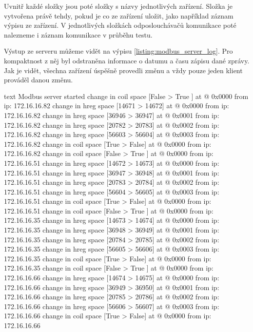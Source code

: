 Uvnitř každé složky jsou poté složky s názvy jednotlivých zařízení. Složka je vytvořena právě tehdy, pokud je co ze zařízení uložit, jako například záznam výpisu ze zařízení. V jednotlivých složkách odposlouchávačů komunikace poté nalezneme i záznam komunikace v průběhu testu. 

Výstup ze serveru můžeme vidět na výpisu \ref{listing:modbus_server_log}. Pro kompaktnost z něj byl odstraněna informace o datumu a času zápisu dané zprávy. Jak je vidět, všechna zařízení úspěšně provedli změnu a vždy pouze jeden klient prováděl danou změnu.

\begin{listing}[htbp]
    \centering
    \begin{cminted}[breaklines,autogobble, fontsize=\footnotesize]{text}
Modbus server started
change in coil space [False > True ] at @ 0x0000 from ip: 172.16.16.82   
change in hreg space [14671 > 14672] at @ 0x0000 from ip: 172.16.16.82   
change in hreg space [36946 > 36947] at @ 0x0001 from ip: 172.16.16.82   
change in hreg space [20782 > 20783] at @ 0x0002 from ip: 172.16.16.82   
change in hreg space [56603 > 56604] at @ 0x0003 from ip: 172.16.16.82   
change in coil space [True  > False] at @ 0x0000 from ip: 172.16.16.82   
change in coil space [False > True ] at @ 0x0000 from ip: 172.16.16.51   
change in hreg space [14672 > 14673] at @ 0x0000 from ip: 172.16.16.51   
change in hreg space [36947 > 36948] at @ 0x0001 from ip: 172.16.16.51   
change in hreg space [20783 > 20784] at @ 0x0002 from ip: 172.16.16.51   
change in hreg space [56604 > 56605] at @ 0x0003 from ip: 172.16.16.51   
change in coil space [True  > False] at @ 0x0000 from ip: 172.16.16.51   
change in coil space [False > True ] at @ 0x0000 from ip: 172.16.16.35   
change in hreg space [14673 > 14674] at @ 0x0000 from ip: 172.16.16.35   
change in hreg space [36948 > 36949] at @ 0x0001 from ip: 172.16.16.35   
change in hreg space [20784 > 20785] at @ 0x0002 from ip: 172.16.16.35   
change in hreg space [56605 > 56606] at @ 0x0003 from ip: 172.16.16.35   
change in coil space [True  > False] at @ 0x0000 from ip: 172.16.16.35   
change in coil space [False > True ] at @ 0x0000 from ip: 172.16.16.66   
change in hreg space [14674 > 14675] at @ 0x0000 from ip: 172.16.16.66   
change in hreg space [36949 > 36950] at @ 0x0001 from ip: 172.16.16.66   
change in hreg space [20785 > 20786] at @ 0x0002 from ip: 172.16.16.66   
change in hreg space [56606 > 56607] at @ 0x0003 from ip: 172.16.16.66   
change in coil space [True  > False] at @ 0x0000 from ip: 172.16.16.66   

\end{cminted}
\end{listing}
